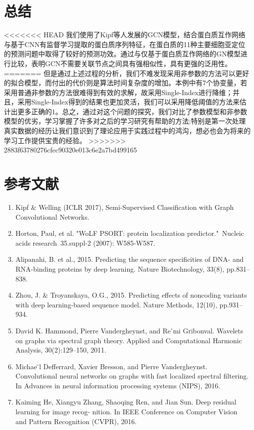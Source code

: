 \documentclass[a4paper,UTF8]{article}
\begin{document}
\section{总结}

<<<<<<< HEAD
我们使用了Kipf等人发展的GCN模型，结合蛋白质互作网络与基于CNN有监督学习提取的蛋白质序列特征，在蛋白质的11种主要细胞亚定位的预测问题中取得了较好的预测功效。通过与仅基于蛋白质互作网络的GN模型进行比较，表明GCN不需要关联节点之间具有强相似性，具有更强的泛用性。
=======
但是通过上述过程的分析，我们不难发现采用非参数的方法可以更好的拟合模型，而付出的代价则是算法时间复杂度的增加。本例中有7个协变量，若采用普通非参数的方法很难得到有效的求解，故采用Single-Index进行降维；并且，采用Single-Index得到的结果也更加灵活，我们可以采用降低阈值的方法来估计出更多正确的1。总之，通过对这个问题的探究，我们对比了参数模型和非参数模型的优劣，学习掌握了许多对之后的学习研究有帮助的方法;特别是第一次处理真实数据的经历让我们意识到了理论应用于实践过程中的鸿沟，想必也会为将来的学习工作提供宝贵的经验。
\cite{kipf2016semi}
>>>>>>> 2883f63780276cfec90320e013c6e2a7bd499165

\section{参考文献}
\begin{enumerate}[(1)]
	\item Kipf $\&$ Welling (ICLR 2017), Semi-Supervised Classification with Graph Convolutional Networks.
	\item Horton, Paul, et al. "WoLF PSORT: protein localization predictor." Nucleic acids research 35.suppl-2 (2007): W585-W587.
	\item Alipanahi, B. et al., 2015. Predicting the sequence specificities of DNA- and RNA-binding proteins by deep learning. Nature Biotechnology, 33(8), pp.831–838.
	\item Zhou, J. $\&$ Troyanskaya, O.G., 2015. Predicting effects of noncoding variants with deep learning-based sequence model. Nature Methods, 12(10), pp.931–934.
	\item David K. Hammond, Pierre Vandergheynst, and Re ́mi Gribonval. Wavelets on graphs via spectral graph theory. Applied and Computational Harmonic Analysis, 30(2):129–150, 2011.
	\item Michae ̈l Defferrard, Xavier Bresson, and Pierre Vandergheynst. Convolutional neural networks on graphs with fast localized spectral filtering. In Advances in neural information processing systems (NIPS), 2016.
	\item 
	Kaiming He, Xiangyu Zhang, Shaoqing Ren, and Jian Sun. Deep residual learning for image recog- nition. In IEEE Conference on Computer Vision and Pattern Recognition (CVPR), 2016.

\end{enumerate}
 
%
%
\end{document}
